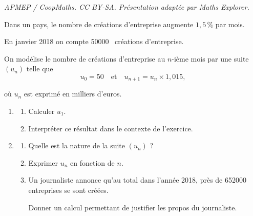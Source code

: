 \documentclass[10pt]{article}
\providecommand{\np}[2][]{{#2~#1}}
\begin{document}
\noindent\textit{APMEP / CoopMaths. CC BY-SA. Présentation adaptée par Maths Explorer.}\par\medskip
\medskip

Dans un pays, le nombre de créations d'entreprise augmente $1,5\,\%$ par mois.

En janvier 2018 on compte \np{50000} créations d'entreprise.

On modélise le nombre de créations d'entreprise au $n$-ième mois par une suite $\left(u_n\right)$ telle que \[u_0 = 50 \quad \text{et} \quad u_{n+1} = u_n \times 1,015,\]

où $u_n$ est exprimé en milliers d'euros.

\medskip

\begin{enumerate}
\item 
	\begin{enumerate}
		\item Calculer $u_1$.
		\item Interpréter ce résultat dans le contexte de l'exercice.
	\end{enumerate}
\item	
	\begin{enumerate}
		\item Quelle est la nature de la suite $\left(u_n\right)$ ?

		\item Exprimer $u_n$ en fonction de $n$.
		\item Un journaliste annonce qu'au total dans l'année 2018, près de \np{652000} entreprises se sont
créées.

Donner un calcul permettant de justifier les propos du journaliste.
	\end{enumerate}
\end{enumerate}

\medskip
\end{document}
